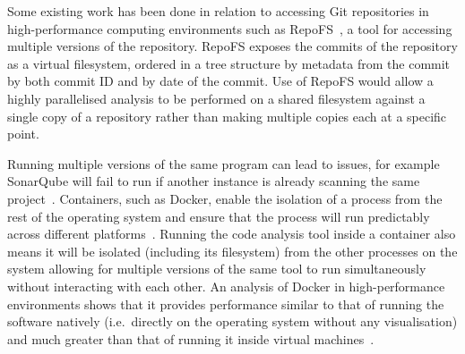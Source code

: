 Some existing work has been done in relation to accessing Git repositories in high-performance computing environments such as RepoFS~\cite{repofs}, a tool for accessing multiple versions of the repository.
RepoFS exposes the commits of the repository as a virtual filesystem, ordered in a tree structure by metadata from the commit by both commit ID and by date of the commit.
Use of RepoFS would allow a highly parallelised analysis to be performed on a shared filesystem against a single copy of a repository rather than making multiple copies each at a specific point.

Running multiple versions of the same program can lead to issues, for example SonarQube will fail to run if another instance is already scanning the same project~\cite{sonarqube_parallel}.
Containers, such as Docker, enable the isolation of a process from the rest of the operating system and ensure that the process will run predictably across different platforms~\cite{container_benefits}.
Running the code analysis tool inside a container also means it will be isolated (including its filesystem) from the other processes on the system allowing for multiple versions of the same tool to run simultaneously without interacting with each other.
An analysis of Docker in high-performance environments shows that it provides performance similar to that of running the software natively (i.e.\ directly on the operating system without any visualisation) and much greater than that of running it inside virtual machines~\cite{docker_hpc}.
